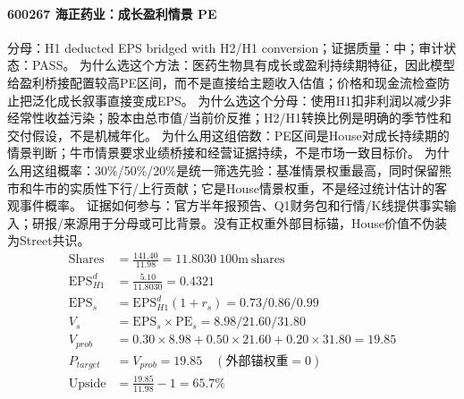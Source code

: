 \paragraph{600267 海正药业：成长盈利情景 PE}
分母：H1 deducted EPS bridged with H2/H1 conversion；证据质量：中；审计状态：PASS。
为什么选这个方法：医药生物具有成长或盈利持续期特征，因此模型给盈利桥接配置较高PE区间，而不是直接给主题收入估值；价格和现金流检查防止把泛化成长叙事直接变成EPS。
为什么选这个分母：使用H1扣非利润以减少非经常性收益污染；股本由总市值/当前价反推；H2/H1转换比例是明确的季节性和交付假设，不是机械年化。
为什么用这组倍数：PE区间是House对成长持续期的情景判断；牛市情景要求业绩桥接和经营证据持续，不是市场一致目标价。
为什么用这组概率：30\%/50\%/20\%是统一筛选先验：基准情景权重最高，同时保留熊市和牛市的实质性下行/上行贡献；它是House情景权重，不是经过统计估计的客观事件概率。
证据如何参与：官方半年报预告、Q1财务包和行情/K线提供事实输入；研报/来源用于分母或可比背景。没有正权重外部目标锚，House价值不伪装为Street共识。
\begin{align*}
\mathrm{Shares} &= \frac{141.40}{11.98}=11.8030\ \mathrm{100m\ shares}\\
\mathrm{EPS}_{H1}^d &= \frac{5.10}{11.8030}=0.4321\\
\mathrm{EPS}_s &= \mathrm{EPS}_{H1}^d(1+r_s)=0.73/0.86/0.99\\
V_s &= \mathrm{EPS}_s\times \mathrm{PE}_s=8.98/21.60/31.80\\
V_{prob} &= 0.30\times 8.98+0.50\times 21.60+0.20\times 31.80=19.85\\
P_{target} &= V_{prob}=19.85\quad(\text{外部锚权重}=0)\\
\mathrm{Upside} &= \frac{19.85}{11.98}-1=65.7\%\\
\end{align*}

